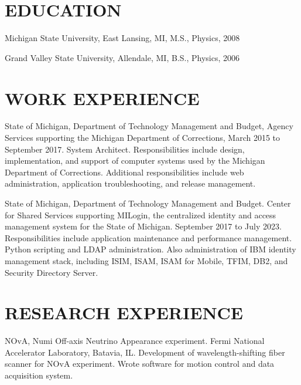 \documentclass{res}
\begin{document}
 
\thispagestyle{empty} %
\address{5227 Witherspoon Way\\
Holt, MI 48842\\
(517) 242 - 3267\\
pagebrian3@gmail.com}


\begin{resume}
\vspace{0.1in}

\section{EDUCATION}
\vspace{0.1in}  
    
    Michigan State University, East Lansing, MI, M.S., Physics, 2008 
 
    Grand Valley State University, Allendale, MI, B.S., Physics, 2006 
 
\section{WORK EXPERIENCE}
\vspace{0.1in}

State of Michigan, Department of Technology Management and Budget, Agency Services supporting the Michigan Department of Corrections, March 2015 to September 2017.  System Architect.  Responsibilities include design, implementation, and support of computer systems used by the Michigan Department of Corrections.  Additional responsibilities include web administration, application troubleshooting, and release management.

State of Michigan, Department of Technology Management and Budget.  Center for Shared Services supporting MILogin, the centralized identity and access management system for the State of Michigan.  September 2017 to July 2023.  Responsibilities include application maintenance and performance management.  Python scripting and LDAP administration.  Also administration of IBM identity management stack, including ISIM, ISAM, ISAM for Mobile, TFIM, DB2, and Security Directory Server.
	
\section{RESEARCH EXPERIENCE}
	\vspace{0.1in}
	
	NOvA, Numi Off-axis Neutrino Appearance experiment.  Fermi National Accelerator Laboratory, Batavia, IL. Development of wavelength-shifting fiber scanner for NOvA experiment.  Wrote software for motion control and data acquisition system.
	

\end{resume}
\end{document}
